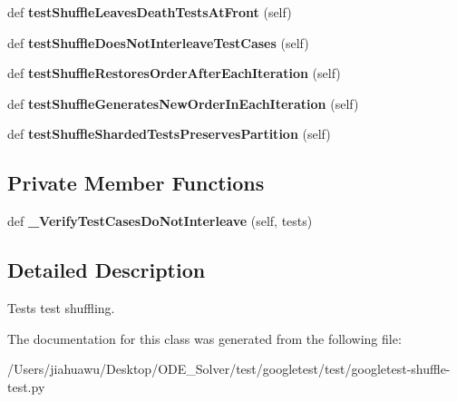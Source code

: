 \begin{DoxyCompactItemize}
def {\bfseries test\+Shuffle\+Leaves\+Death\+Tests\+At\+Front} (self)
\item 
\mbox{\label{classgoogletest-shuffle-test_1_1_g_test_shuffle_unit_test_a837b80b2c328cf030812d67b5d977b45}} 
def {\bfseries test\+Shuffle\+Does\+Not\+Interleave\+Test\+Cases} (self)
\item 
\mbox{\label{classgoogletest-shuffle-test_1_1_g_test_shuffle_unit_test_a04c8c704394572758647c8133e51e445}} 
def {\bfseries test\+Shuffle\+Restores\+Order\+After\+Each\+Iteration} (self)
\item 
\mbox{\label{classgoogletest-shuffle-test_1_1_g_test_shuffle_unit_test_ab87139a0521f324af16b086190a80601}} 
def {\bfseries test\+Shuffle\+Generates\+New\+Order\+In\+Each\+Iteration} (self)
\item 
\mbox{\label{classgoogletest-shuffle-test_1_1_g_test_shuffle_unit_test_a9e21814173c0822718d74c79c10e3b21}} 
def {\bfseries test\+Shuffle\+Sharded\+Tests\+Preserves\+Partition} (self)
\end{DoxyCompactItemize}
\subsection*{Private Member Functions}
\begin{DoxyCompactItemize}
\item 
\mbox{\label{classgoogletest-shuffle-test_1_1_g_test_shuffle_unit_test_a8021741dc0c7849d2242dc1f83b6ae23}} 
def {\bfseries \+\_\+\+Verify\+Test\+Cases\+Do\+Not\+Interleave} (self, tests)
\end{DoxyCompactItemize}


\subsection{Detailed Description}
\begin{DoxyVerb}Tests test shuffling.\end{DoxyVerb}
 

The documentation for this class was generated from the following file\+:\begin{DoxyCompactItemize}
\item 
/\+Users/jiahuawu/\+Desktop/\+O\+D\+E\+\_\+\+Solver/test/googletest/test/googletest-\/shuffle-\/test.\+py\end{DoxyCompactItemize}
